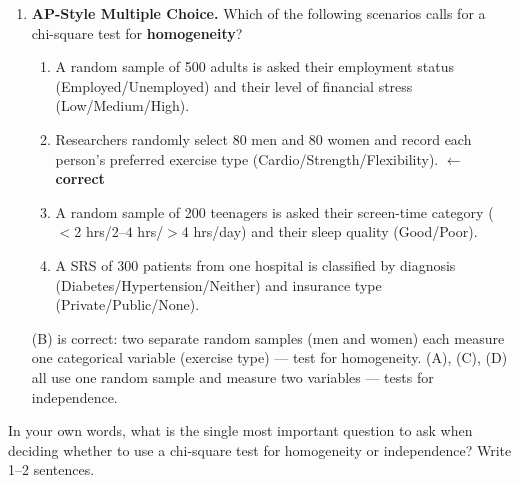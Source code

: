 \documentclass[10pt]{article}
\begin{document}
\begin{enumerate}
\begin{enumerate}[label=(\alph*)]
        \end{enumerate}

  \item \textbf{AP-Style Multiple Choice.} Which of the following scenarios calls for
        a chi-square test for \textbf{homogeneity}?

        \begin{enumerate}[label=(\Alph*)]
          \item A random sample of 500 adults is asked their employment status
                (Employed/Unemployed) and their level of financial stress (Low/Medium/High).
          \item Researchers randomly select 80 men and 80 women and record each person's
                preferred exercise type (Cardio/Strength/Flexibility).
                \textcolor{keyred}{\textbf{$\leftarrow$ correct}}
          \item A random sample of 200 teenagers is asked their screen-time category
                ($<$2 hrs/$2$--$4$ hrs/$>$4 hrs/day) and their sleep quality (Good/Poor).
          \item A SRS of 300 patients from one hospital is classified by diagnosis
                (Diabetes/Hypertension/Neither) and insurance type (Private/Public/None).
        \end{enumerate}

        \begin{teachernote}
            (B) is correct: two separate random samples (men and women) each measure
            one categorical variable (exercise type) --- test for homogeneity.
            (A), (C), (D) all use one random sample and measure two variables --- tests
            for independence.
        \end{teachernote}

\end{enumerate}

\begin{reflectionbox}
In your own words, what is the single most important question to ask when deciding whether
to use a chi-square test for homogeneity or independence? Write 1--2 sentences.

\end{reflectionbox}
\end{document}
